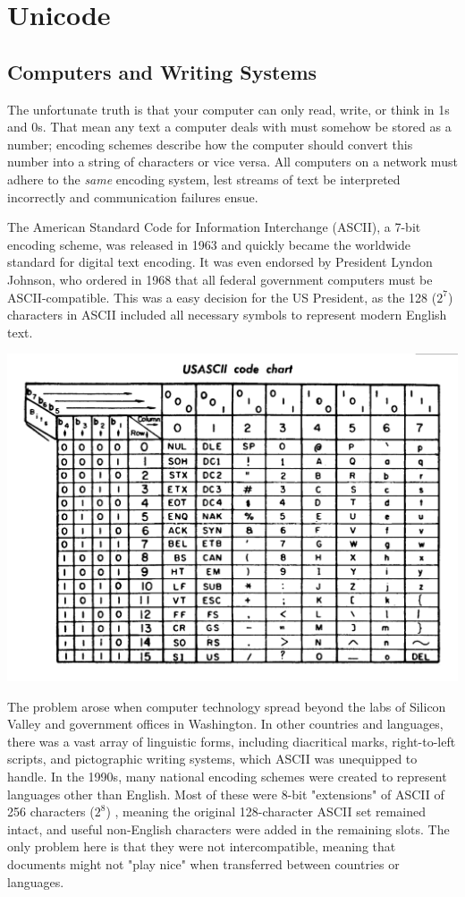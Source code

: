 \section{Unicode}

\subsection{Computers and Writing Systems}

The unfortunate truth is that your computer can only read, write, or think in 1s
and 0s. That mean any text a computer deals with must somehow be stored as a
number; encoding schemes describe how the computer should convert this number
into a string of characters or vice versa. All computers on a network must
adhere to the \textit{same} encoding system, lest streams of text be interpreted
incorrectly and communication failures ensue.

The American Standard Code for Information Interchange (ASCII), a 7-bit encoding
scheme, was released in 1963 and quickly became the worldwide standard for
digital text encoding. It was even endorsed by President Lyndon Johnson, who
ordered in 1968 that all federal government computers must be ASCII-compatible.
This was a easy decision for the US President, as the 128 ($2^7$) characters in ASCII
included all necessary symbols to represent modern English text.

\includegraphics[scale=0.1]{subtex/ascii-chart.png}

The problem arose when computer technology spread beyond the labs of Silicon
Valley and government offices in Washington. In other countries and languages,
there was a vast array of linguistic forms, including diacritical marks,
right-to-left scripts, and pictographic writing systems, which ASCII was
unequipped to handle. In the 1990s, many national encoding schemes were created
to represent languages other than English. Most of these were 8-bit "extensions"
of ASCII of 256 characters ($2^8$) , meaning the original 128-character ASCII
set remained intact, and useful non-English characters were added in the
remaining slots. The only problem here is that they were not intercompatible,
meaning that documents might not "play nice" when transferred between countries
or languages.

